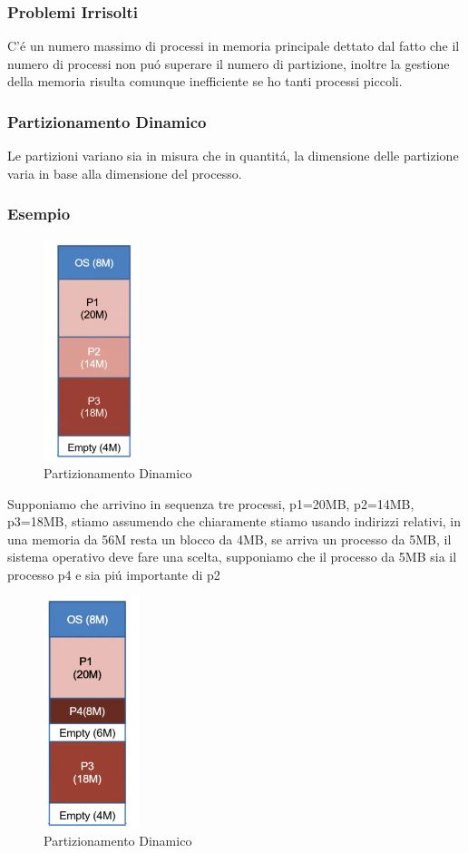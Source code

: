     \subsubsection*{Problemi Irrisolti}
    C'é un numero massimo di processi in memoria principale dettato dal fatto che il numero di processi non puó superare
    il numero di partizione, inoltre la gestione della memoria risulta comunque inefficiente se ho tanti processi piccoli.
    \subsubsection{Partizionamento Dinamico}
    Le partizioni variano sia in misura che in quantitá, la dimensione delle partizione varia in base alla dimensione 
    del processo.
    \subsubsection*{Esempio}
    \begin{figure}[H]
        \centering
        \includegraphics[width=0.25\textwidth]{immagini/EsempioPartizionamentoDinamico}
        \caption{Partizionamento Dinamico}
    \end{figure}
    Supponiamo che arrivino in sequenza tre processi, p1=20MB, p2=14MB, p3=18MB, stiamo
    assumendo che chiaramente stiamo usando indirizzi relativi, in una memoria da 56M
    resta un blocco da 4MB, se arriva un processo da 5MB, il sistema operativo deve fare una
    scelta, supponiamo che il processo da 5MB sia il processo p4 e sia piú importante di p2
    \begin{figure}[H]
        \centering
        \includegraphics[width=0.25\textwidth]{immagini/EsempioPartizionamentoDinamico2}
        \caption{Partizionamento Dinamico}
    \end{figure}
